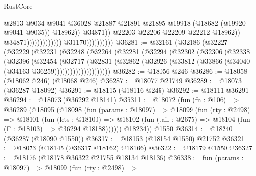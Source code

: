 \begin{lexlean}{RustCore}
\begin{coremodule}
                                                              @2813
                                                              @9034
                                                              @9041
                                                              @36028
                                                              @21887
                                                              @21891
                                                              @21895
                                                              @19918
                                                              (@18682 (@19920 @9041 @9035))
                                                              @18962))
                                                          @34871))
                                                      @22203
                                                      @22206
                                                      @22209
                                                      @22212
                                                      @18962))
                                                  @34871)))))))))))))
                        @31170))))))))))
@36281 := @32161
    (@32186
      (@32227
        (@32229
          (@32231
            (@32248
              (@32264
                (@32281
                  (@32294
                    (@32302
                      (@32306
                        (@32338
                          (@32396
                            (@32454
                              (@32717
                                (@32831
                                  (@32862
                                    (@32926
                                      (@33812 (@33866 (@34040 (@34163 @36259)))))))))))))))))))))
@36282 := @18056 @246
@36286 := @18058 (@18062 @246) (@18068 @246)
@36287 := @18077 @21749
@36289 := @18073 (@36287 @18092)
@36291 := @18115 (@18116 @246)
@36292 := @18111 @36291
@36294 := @18073 (@36292 @18141)
@36311 := @18072
    (fun (fn : @106) =>
    @36289
      (@18095
        (@18098
          (fun (params : @18097) =>
          @18099
            (fun (rty : @2498) =>
            @18101
              (fun (lets : @18100) =>
              @18102 (fun (tail : @2675) => @18104 (fun (Γ : @18103) => @36294 @18188))))))
        @18234))
    @1550
@36314 := @18240 (@36287 (@18090 @1550))
@36317 := @18153 (@18154 @1550) @21752
@36321 := @18073 (@18145 (@36317 @18162) @18166)
@36322 := @18179 @1550
@36327 := @18176 (@18178 @36322 @21755 @18134 @18136)
@36338 := fun (params : @18097) =>
  @18099
    (fun (rty : @2498) =>

\end{coremodule}
\end{lexlean}
